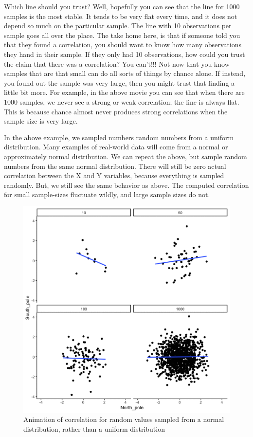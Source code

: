 \documentclass[
]{book}
\begin{document}
Which line should you trust? Well, hopefully you can see that the line for 1000 samples is the most stable. It tends to be very flat every time, and it does not depend so much on the particular sample. The line with 10 observations per sample goes all over the place. The take home here, is that if someone told you that they found a correlation, you should want to know how many observations they hand in their sample. If they only had 10 observations, how could you trust the claim that there was a correlation? You can't!!! Not now that you know samples that are that small can do all sorts of things by chance alone. If instead, you found out the sample was very large, then you might trust that finding a little bit more. For example, in the above movie you can see that when there are 1000 samples, we never see a strong or weak correlation; the line is always flat. This is because chance almost never produces strong correlations when the sample size is very large.

In the above example, we sampled numbers random numbers from a uniform distribution. Many examples of real-world data will come from a normal or approximately normal distribution. We can repeat the above, but sample random numbers from the same normal distribution. There will still be zero actual correlation between the X and Y variables, because everything is sampled randomly. But, we still see the same behavior as above. The computed correlation for small sample-sizes fluctuate wildly, and large sample sizes do not.

\begin{figure}
\centering
\includegraphics{gifs/corNormFourNs-1.gif}
\caption{\label{fig:3normCorfour}Animation of correlation for random values sampled from a normal distribution, rather than a uniform distribution}
\end{figure}
\end{document}
